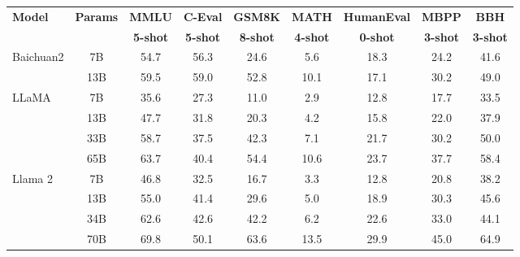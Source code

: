 \begin{table}[ht]
\centering
\begin{tabular}{l c c c c c c c c}
\hline
\textbf{Model}      & \textbf{Params} & \textbf{MMLU} & \textbf{C-Eval} & \textbf{GSM8K} & \textbf{MATH} & \textbf{HumanEval} & \textbf{MBPP} & \textbf{BBH} \\ 
                    &                 & \textbf{5-shot} & \textbf{5-shot} & \textbf{8-shot} & \textbf{4-shot} & \textbf{0-shot}    & \textbf{3-shot} & \textbf{3-shot} \\ \hline

Baichuan2            & 7B             & 54.7           & 56.3           & 24.6           & 5.6           & 18.3               & 24.2          & 41.6          \\
                    & 13B            & 59.5           & 59.0           & 52.8           & 10.1          & 17.1               & 30.2          & 49.0          \\ \hline
LLaMA              & 7B             & 35.6           & 27.3           & 11.0           & 2.9           & 12.8               & 17.7          & 33.5          \\
                    & 13B            & 47.7           & 31.8           & 20.3           & 4.2           & 15.8               & 22.0          & 37.9          \\
                    & 33B            & 58.7           & 37.5           & 42.3           & 7.1           & 21.7               & 30.2          & 50.0          \\
                    & 65B            & 63.7           & 40.4           & 54.4           & 10.6          & 23.7               & 37.7          & 58.4          \\ \hline
Llama 2              & 7B             & 46.8           & 32.5           & 16.7           & 3.3           & 12.8               & 20.8          & 38.2          \\
                    & 13B            & 55.0           & 41.4           & 29.6           & 5.0           & 18.9               & 30.3          & 45.6          \\
                    & 34B            & 62.6           & 42.6           & 42.2           & 6.2           & 22.6               & 33.0          & 44.1          \\
                    & 70B            & 69.8           & 50.1           & 63.6           & 13.5          & 29.9               & 45.0          & 64.9          \\ \hline

\end{tabular}
\end{table}
